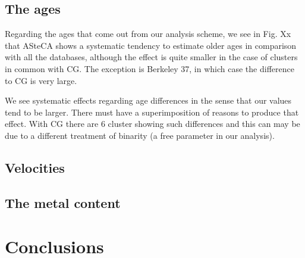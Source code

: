 \documentclass[draft]{aa}
\begin{document}
\subsection{The ages}
Regarding the ages that come out from our analysis scheme, we see in Fig. Xx that
ASteCA shows a systematic tendency to estimate older ages in comparison with all
the databases, although the effect is quite smaller in the case of clusters in
common with CG. The exception is Berkeley 37, in which case the difference to CG
is very large. 

We see systematic effects regarding age differences in the sense that our values
tend to be larger. There must have a superimposition of reasons to produce that
effect. With CG there are 6 cluster showing such differences and this can may be
due to a different treatment of binarity (a free parameter in our analysis).



\subsection{Velocities}



\subsection{The metal content}




\section{Conclusions}
 \label{sec:conclusions}
\end{document}
